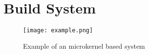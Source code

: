 \documentclass[
	a4paper, %
	11pt, %
	unnumberedsections, %
	twoside, %
]{LTJournalArticle}
\begin{document}
\section{Build System}


\begin{figure*} %
	\texttt{[image: example.png]}
	\caption{Example of an microkernel based system}
	\label{fig:example}
\end{figure*}

\newpage


\printbibliography%
\end{document}
